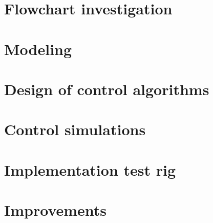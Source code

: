 
\section{Flowchart investigation}

\section{Modeling}

\section{Design of control algorithms}

\section{Control simulations}

\section{Implementation test rig}

\section{Improvements}

